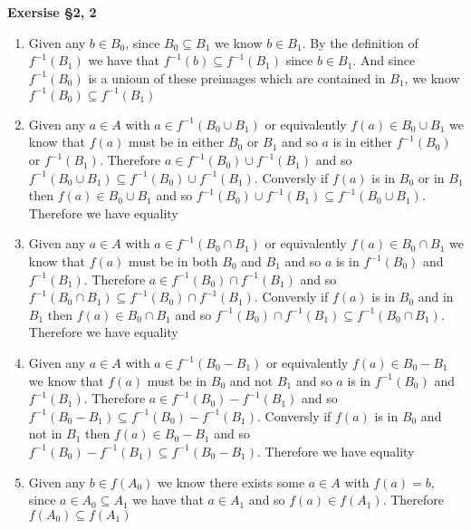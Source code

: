 \documentclass[12pt]{article}
\newenvironment{ques}[1]{\textbf{Exersise #1}\vspace{1 mm}\\ }{\bigskip}
\theoremstyle{definition}
\begin{document}
\begin{ques}{\S 2, 2}
	\begin{enumerate}
		\item
			Given any $b \in B_0$, since $B_0 \subseteq B_1$ we
			know $b \in B_1$. By the definition of $f^{-1}(B_1)$ we
			have that $f^{-1}(b) \subseteq f^{-1}(B_1)$ since $b
			\in B_1$. And since $f^{-1}(B_0)$ is a unioun of
			these preimages which are contained in  $B_1$, we know
			$f^{-1}(B_0) \subseteq f^{-1}(B_1)$

		\item
			Given any $a \in A$ with $a \in f^{-1}(B_0 \cup B_1)$
			or equivalently $f(a) \in B_0 \cup B_1$ we know that
			$f(a)$ must be in either $B_0$ or $B_1$ and so $a$ is
			in either $f^{-1}(B_0)$ or $f^{-1}(B_1)$. Therefore $a
			\in f^{-1}(B_0) \cup f^{-1}(B_1)$ and so $f^{-1}(B_0
			\cup B_1) \subseteq f^{-1}(B_0) \cup f^{-1}(B_1)$.
			Conversly if $f(a)$ is in $B_0$ or in $B_1$ then $f(a)
			\in B_0 \cup B_1$ and so $f^{-1}(B_0) \cup f^{-1}(B_1)
			\subseteq f^{-1}(B_0 \cup B_1)$. Therefore we
			have equality

		\item
			Given any $a \in A$ with $a \in f^{-1}(B_0 \cap B_1)$
			or equivalently $f(a) \in B_0 \cap B_1$ we know that
			$f(a)$ must be in both $B_0$ and $B_1$ and so $a$ is
			in $f^{-1}(B_0)$ and $f^{-1}(B_1)$. Therefore $a
			\in f^{-1}(B_0) \cap f^{-1}(B_1)$ and so $f^{-1}(B_0
			\cap B_1) \subseteq f^{-1}(B_0) \cap f^{-1}(B_1)$.
			Conversly if $f(a)$ is in $B_0$ and in $B_1$ then $f(a)
			\in B_0 \cap B_1$ and so $f^{-1}(B_0) \cap f^{-1}(B_1)
			\subseteq f^{-1}(B_0 \cap B_1)$. Therefore we
			have equality

		\item
			Given any $a \in A$ with $a \in f^{-1}(B_0 - B_1)$
			or equivalently $f(a) \in B_0 - B_1$ we know that
			$f(a)$ must be in $B_0$ and not $B_1$ and so $a$ is
			in $f^{-1}(B_0)$ and $f^{-1}(B_1)$. Therefore $a
			\in f^{-1}(B_0) - f^{-1}(B_1)$ and so $f^{-1}(B_0
			- B_1) \subseteq f^{-1}(B_0) - f^{-1}(B_1)$.
			Conversly if $f(a)$ is in $B_0$ and not in $B_1$ then $f(a)
			\in B_0 - B_1$ and so $f^{-1}(B_0) - f^{-1}(B_1)
			\subseteq f^{-1}(B_0 - B_1)$. Therefore we
			have equality

		\item
			Given any $b \in f(A_0)$ we know there exists some $a
			\in A$ with $f(a) = b$, since $a \in A_0 \subseteq A_1$
			we have that $a \in A_1$ and so $f(a) \in f(A_1)$.
			Therefore $f(A_0) \subseteq f(A_1)$


\end{enumerate}
\end{ques}
\end{document}
